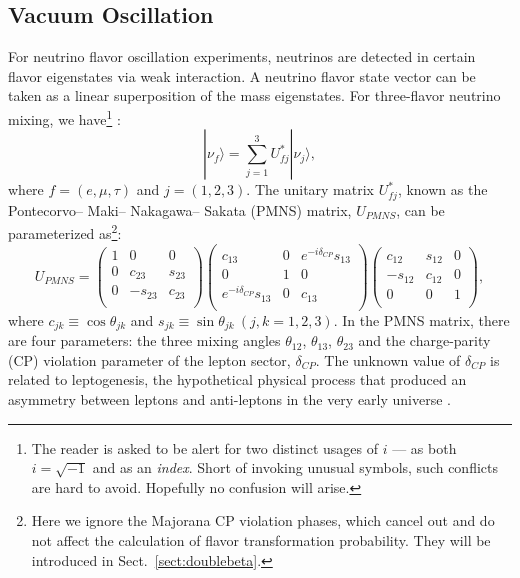 \subsection{Vacuum Oscillation}\label{sect:VacuumOsci}
For neutrino flavor oscillation experiments, neutrinos are detected in certain flavor eigenstates via weak interaction. A neutrino flavor state vector can be taken as a linear superposition of the mass eigenstates. For three-flavor neutrino mixing, we have\footnote{The reader is asked to be alert for two distinct usages of $i$ --- as both $i=\sqrt{-1}$ and as an {\em index}. Short of invoking unusual symbols, such conflicts are hard to avoid. Hopefully no confusion will arise.} \cite{pdg2020}:
\begin{equation}\label{eq:mixingmatrix}
|\nu_f\rangle = \sum_{j=1}^3U^*_{fj}|\nu_j\rangle, 
\end{equation}
where $f=(e,\mu,\tau)$ and $j=(1,2,3)$. The unitary matrix $U^*_{fj}$, known as the Pontecorvo– Maki– Nakagawa– Sakata (PMNS) matrix, $U_{PMNS}$, can be parameterized as\footnote{Here we ignore the Majorana CP violation phases, which cancel out and do not affect the calculation of flavor transformation probability. They will be introduced in Sect.~\ref{sect:doublebeta}.}: 
\begin{equation}\label{eq:uPMNS}
U_{PMNS} =
\begin{pmatrix}
1 &0 &0\\
0 &c_{23} &s_{23}\\
0 &-s_{23} &c_{23}\\ 
\end{pmatrix}
\begin{pmatrix}
c_{13} &0 &e^{-i\delta_{CP}}s_{13}\\
0 &1 &0\\
e^{-i\delta_{CP}}s_{13} &0 &c_{13}\\ 
\end{pmatrix}
\begin{pmatrix}
c_{12} &s_{12} &0\\
-s_{12} &c_{12} &0\\
0 &0 &1\\ 
\end{pmatrix},
\end{equation}
where $c_{jk}\equiv \cos\theta_{jk}$ and $s_{jk}\equiv \sin\theta_{jk}~(j,k = 1,2,3)$. In the PMNS matrix, there are four parameters: the three mixing angles $\theta_{12}$, $\theta_{13}$, $\theta_{23}$ and the charge-parity (CP) violation parameter of the lepton sector, $\delta_{CP}$. The unknown value of $\delta_{CP}$ is related to leptogenesis, the hypothetical physical process that produced an asymmetry between leptons and anti-leptons in the very early universe \cite{wiki_cp}. 

